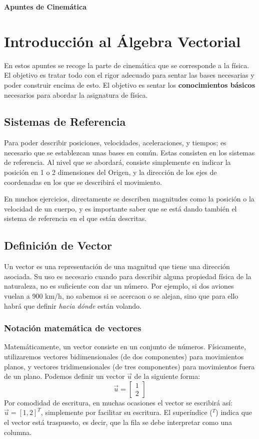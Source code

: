 \documentclass[ %
    oneside,    %
    10pt        %
]{apuntes} %
\begin{document}
\begin{center}  %
	\LARGE \textbf{Apuntes de Cinemática} %
\end{center}
\section{Introducción al Álgebra Vectorial}
En estos apuntes se recoge la parte de cinemática que se corresponde a la física. El objetivo es tratar todo con el rigor adecuado para sentar las bases necesarias y poder construir encima de esto. El objetivo es sentar los \textbf{conocimientos básicos} necesarios para abordar la asignatura de física.

\subsection{Sistemas de Referencia}
Para poder describir posiciones, velocidades, aceleraciones, y tiempos; es necesario que se establezcan unas bases en común. Estas consisten en los sistemas de referencia. Al nivel que se abordará, consiste simplemente en indicar la posición en 1 o 2 dimensiones del Origen, y la dirección de los ejes de coordenadas en los que se describirá el movimiento.
\par En muchos ejercicios, directamente se describen magnitudes como la posición o la velocidad de un cuerpo, y es importante saber que se está dando también el sistema de referencia en el que están descritas.

\subsection{Definición de Vector}
Un vector es una representación de una magnitud que tiene una dirección asociada. Su uso es necesario cuando para describir alguna propiedad física de la naturaleza, no es suficiente con dar un número. Por ejemplo, si dos aviones vuelan a 900 km/h, no sabemos si se acercaon o se  alejan, sino que para ello habrá que definir \textit{hacia dónde} están volando.
\subsubsection{Notación matemática de vectores}
Matemáticamente, un vector consiste en un conjunto de números. Físicamente, utilizaremos vectores bidimensionales (de dos componentes) para movimientos planos, y vectores tridimensionales (de tres componentes) para movimientos fuera de un plano. Podemos definir un vector $\vec{u}$ de la siguiente forma:
\[ \vec{u} = \left[\begin{array}{c} 1 \\ 2 \end{array}\right]\]
Por comodidad de escritura, en muchas ocasiones el vector se escribirá así: $\vec{u} = [1, 2]^T$, simplemente por facilitar su escritura. El superíndice ($^T$) indica que el vector está traspuesto, es decir, que la fila se debe interpretar como una columna.
\end{document}
